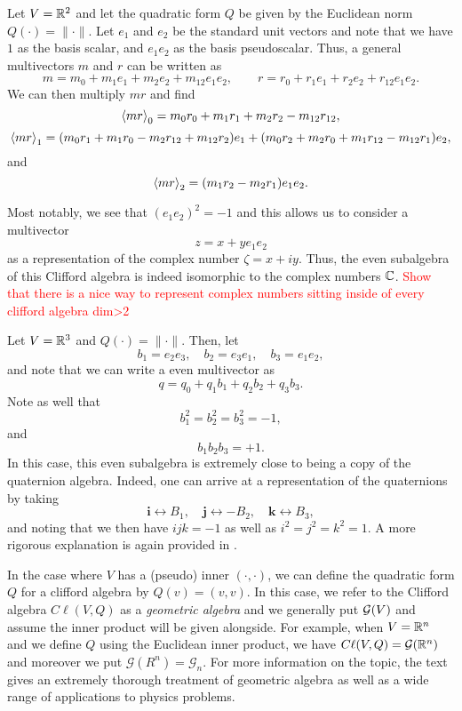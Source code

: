 \documentclass[12pt]{article}
\begin{document}
\begin{example}
Let $V=\R^2$ and let the quadratic form $Q$ be given by the Euclidean norm $Q(\cdot)=\|\cdot\|$.  Let $e_1$ and $e_2$ be the standard unit vectors and note that we have $1$ as the basis scalar, and $e_1e_2$ as the basis pseudoscalar.  Thus, a general multivectors $m$ and $r$ can be written as
\[
m = m_0 + m_1 e_1 + m_2 e_2 + m_{12} e_1 e_2, \qquad r = r_0 +r_1 e_1 + r_2 e_2 + r_{12}e_1 e_2.
\]
We can then multiply $mr$ and find
\[
\proj{0}{mr} = m_0r_0 + m_1 r_1 + m_2 r_2 - m_{12}r_{12},
\]
\[
\proj{1}{mr} = (m_0 r_1 + m_1 r_0 - m_2 r_{12} + m_{12} r_2) e_1 + (m_0 r_2 + m_2 r_0 + m_1r_{12} - m_{12} r_1) e_2,
\]
and
\[
\proj{2}{mr} = (m_1r_2 - m_2 r_1)e_1e_2.
\]

Most notably, we see that $(e_1e_2)^2=-1$ and this allows us to consider a multivector 
\[
z = x + y e_1 e_2 
\]
as a representation of the complex number $\zeta = x+ iy$.  Thus, the even subalgebra of this Clifford algebra is indeed isomorphic to the complex numbers $\C$. \textcolor{red}{Show that there is a nice way to represent complex numbers sitting inside of every clifford algebra dim>2}
\end{example}

\begin{example}
\label{ex:quaternions}
Let $V=\R^3$ and $Q(\cdot)=\|\cdot \|$.  Then, let
\[
b_1 = e_2 e_3, \quad b_2 = e_3 e_1, \quad b_3 = e_1 e_2,
\]
and note that we can write a even multivector as
\[
q = q_0 + q_1b_1 + q_2 b_2 + q_3 b_3.
\]
Note as well that
\[
b_1^2 = b_2^2 = b_3^2 = -1,
\]
and
\[
b_1b_2b_3 = +1.
\]
In this case, this even subalgebra is extremely close to being a copy of the quaternion algebra. Indeed, one can arrive at a representation of the quaternions by taking
\[
\boldsymbol{i} \leftrightarrow B_1, \quad \boldsymbol{j} \leftrightarrow -B_2, \quad \boldsymbol{k} \leftrightarrow B_3,
\]
and noting that we then have $ijk=-1$ as well as $i^2=j^2=k^2=1$. A more rigorous explanation is again provided in \cite{doran_geometric_2003}.
\end{example}

In the case where $V$ has a (pseudo) inner $(\cdot,\cdot)$, we can define the quadratic form $Q$ for a clifford algebra by $Q(v)=(v,v)$.  In this case, we refer to the Clifford algebra $C\ell(V,Q)$ as a \emph{geometric algebra} and we generally put $\geometricalg$ and assume the inner product will be given alongside.  For example, when $V=\R^n$ and we define $Q$ using the Euclidean inner product, we have $C\ell(V,Q)=\mathcal{G}(\R^n)$ and moreover we put $\mathcal{G}(R^n)=\mathcal{G}_n$. For more information on the topic, the text \cite{doran_geometric_2003} gives an extremely thorough treatment of geometric algebra as well as a wide range of applications to physics problems. 
\end{document}

